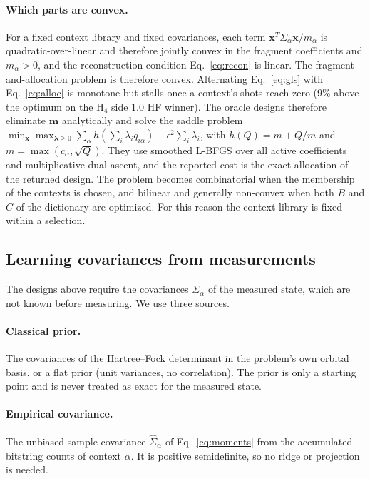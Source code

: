 \documentclass[aps,pra,reprint,superscriptaddress,nofootinbib]{revtex4-2}
\begin{document}
\paragraph{Which parts are convex.} For a fixed context library and fixed covariances, each term $\boldsymbol x^{T}\Sigma_\alpha\boldsymbol x/m_\alpha$ is quadratic-over-linear and therefore jointly convex in the fragment coefficients and $m_\alpha>0$, and the reconstruction condition Eq.~\eqref{eq:recon} is linear. The fragment-and-allocation problem is therefore convex. Alternating Eq.~\eqref{eq:gls} with Eq.~\eqref{eq:alloc} is monotone but stalls once a context's shots reach zero (9\% above the optimum on the H$_4$ side 1.0 HF winner). The oracle designs therefore eliminate $\bm m$ analytically and solve the saddle problem $\min_{\bm x}\max_{\bm\lambda\ge0}\sum_\alpha h(\sum_i\lambda_iq_{i\alpha})-\epsilon^2\sum_i\lambda_i$, with $h(Q)=m+Q/m$ and $m=\max(c_\alpha,\sqrt Q)$. They use smoothed L-BFGS over all active coefficients and multiplicative dual ascent, and the reported cost is the exact allocation of the returned design. The problem becomes combinatorial when the membership of the contexts is chosen, and bilinear and generally non-convex when both $B$ and $C$ of the dictionary are optimized. For this reason the context library is fixed within a selection.

\subsection{Learning covariances from measurements}
\label{sec:cov}

The designs above require the covariances $\Sigma_\alpha$ of the measured state, which are not known before measuring. We use three sources.

\paragraph{Classical prior.} The covariances of the Hartree--Fock determinant in the problem's own orbital basis, or a flat prior (unit variances, no correlation). The prior is only a starting point and is never treated as exact for the measured state.

\paragraph{Empirical covariance.} The unbiased sample covariance $\hat\Sigma_\alpha$ of Eq.~\eqref{eq:moments} from the accumulated bitstring counts of context $\alpha$. It is positive semidefinite, so no ridge or projection is needed.
\end{document}
